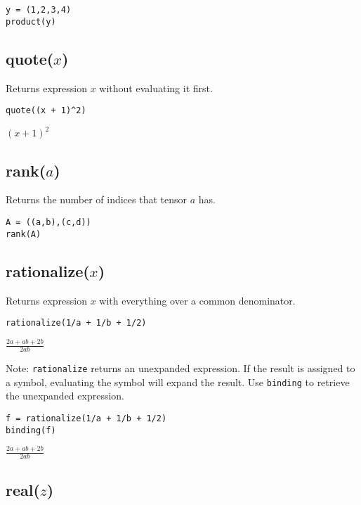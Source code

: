 \documentclass[12pt]{article}
\begin{document}
{\color{blue}
\begin{verbatim}
y = (1,2,3,4)
product(y)
\end{verbatim}
}


\subsection*{quote($x$)}

Returns expression $x$ without evaluating it first.

{\color{blue}
\begin{verbatim}
quote((x + 1)^2)
\end{verbatim}
}

\noindent
$\displaystyle (x+1)^2$

\subsection*{rank($a$)}

Returns the number of indices that tensor $a$ has.

{\color{blue}
\begin{verbatim}
A = ((a,b),(c,d))
rank(A)
\end{verbatim}
}


\subsection*{rationalize($x$)}

Returns expression $x$ with everything over a common denominator.

{\color{blue}
\begin{verbatim}
rationalize(1/a + 1/b + 1/2)
\end{verbatim}
}

\noindent
$\displaystyle \frac{2a+ab+2b}{2ab}$

\bigskip
\noindent
Note:
\verb$rationalize$
returns an unexpanded expression.
If the result is assigned to a symbol, evaluating the symbol will expand the result.
Use
\verb$binding$
to retrieve the unexpanded expression.

{\color{blue}
\begin{verbatim}
f = rationalize(1/a + 1/b + 1/2)
binding(f)
\end{verbatim}
}

\noindent
$\displaystyle \frac{2a+ab+2b}{2ab}$

\subsection*{real($z$)}
\end{document}
